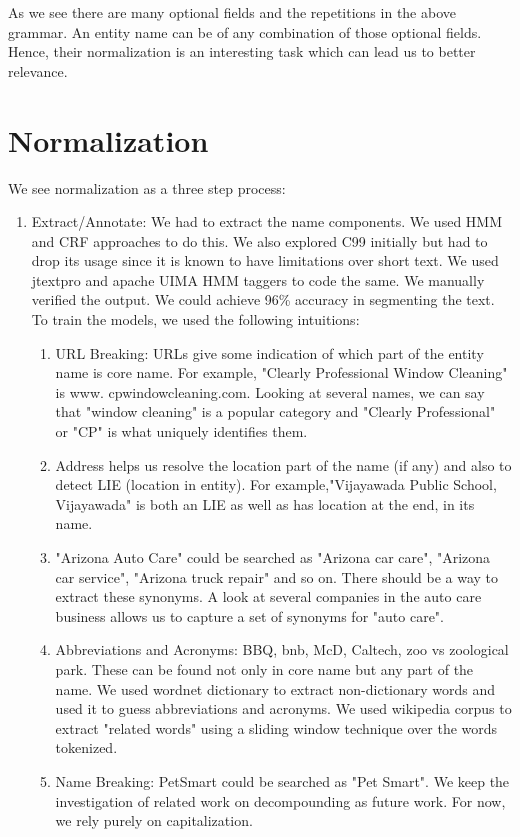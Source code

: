 \documentclass{acm_proc_article-sp}
\begin{document}
As we see there are many optional fields and the repetitions in the above grammar. An entity name can be of any combination of those optional fields. Hence, their normalization is an interesting task which can lead us to better relevance.

\section{Normalization}
We see normalization as a three step process:
\begin{enumerate}
\item Extract/Annotate:  We had to extract the name components. We used HMM and CRF approaches to do this. We also explored C99 initially but had to drop its usage since it is known to have limitations over short text. We used jtextpro and apache UIMA HMM taggers to code the same. We manually verified the output. We could achieve 96\% accuracy in segmenting the text. To train the models, we used the following intuitions:
\begin{enumerate}
\item URL Breaking: URLs give some indication of which part of the entity name is core name. For example, "Clearly Professional Window Cleaning" is www. cpwindowcleaning.com. Looking at several names, we can say that "window cleaning" is a popular category and "Clearly Professional" or "CP" is what uniquely identifies them. 
\item Address helps us resolve the location part of the name (if any) and also to detect LIE (location in entity). For example,"Vijayawada Public School, Vijayawada" is both an LIE as well as has location at the end, in its name.
\item "Arizona Auto Care" could be searched as "Arizona car care", "Arizona car service", "Arizona truck repair" and so on. There should be a way to extract these synonyms. A look at several companies in the auto care business allows us to capture a set of synonyms for "auto care". 
\item Abbreviations and Acronyms: BBQ, bnb, McD, Caltech, zoo vs zoological park. These can be found not only in core name but any part of the name. We used wordnet dictionary to extract non-dictionary words and used it to guess abbreviations and acronyms. We used wikipedia corpus to extract "related words" using a sliding window technique over the words tokenized.  
\item Name Breaking: PetSmart could be searched as "Pet Smart". We keep the investigation of related work on decompounding as future work. For now, we rely purely on capitalization.

\end{enumerate}
\end{enumerate}
\end{document}
